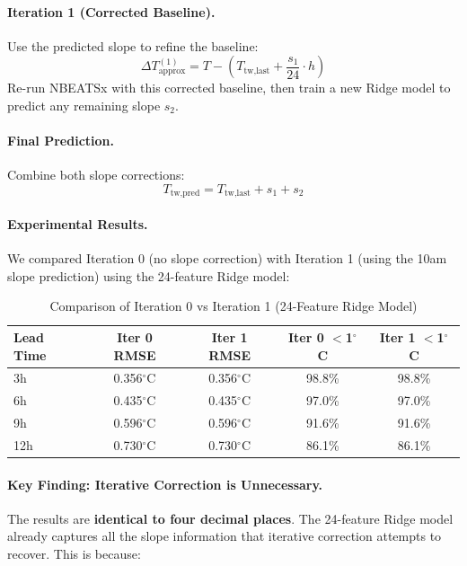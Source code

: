\documentclass[11pt]{article}
\begin{document}
\paragraph{Iteration 1 (Corrected Baseline).}
Use the predicted slope to refine the baseline:
\begin{equation}
\Delta T_{\text{approx}}^{(1)} = T - \left(T_{\text{tw,last}} + \frac{s_1}{24} \cdot h\right)
\end{equation}
Re-run NBEATSx with this corrected baseline, then train a new Ridge model to predict any remaining slope $s_2$.

\paragraph{Final Prediction.}
Combine both slope corrections:
\begin{equation}
T_{\text{tw,pred}} = T_{\text{tw,last}} + s_1 + s_2
\end{equation}

\paragraph{Experimental Results.}
We compared Iteration 0 (no slope correction) with Iteration 1 (using the 10am slope prediction) using the 24-feature Ridge model:

\begin{table}[H]
\centering
\caption{Comparison of Iteration 0 vs Iteration 1 (24-Feature Ridge Model)}
\label{tab:iterative}
\begin{tabular}{lcccc}
\toprule
Lead Time & Iter 0 RMSE & Iter 1 RMSE & Iter 0 $<$1$^\circ$C & Iter 1 $<$1$^\circ$C \\
\midrule
3h & 0.356$^\circ$C & 0.356$^\circ$C & 98.8\% & 98.8\% \\
6h & 0.435$^\circ$C & 0.435$^\circ$C & 97.0\% & 97.0\% \\
9h & 0.596$^\circ$C & 0.596$^\circ$C & 91.6\% & 91.6\% \\
12h & 0.730$^\circ$C & 0.730$^\circ$C & 86.1\% & 86.1\% \\
\bottomrule
\end{tabular}
\end{table}

\paragraph{Key Finding: Iterative Correction is Unnecessary.}
The results are \textbf{identical to four decimal places}. The 24-feature Ridge model already captures all the slope information that iterative correction attempts to recover. This is because:
\end{document}
